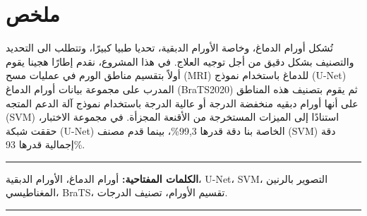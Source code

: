 \chapter*{\hfill  ملخص \hfill}

تُشكل أورام الدماغ، وخاصة الأورام الدبقية، تحديا طبيا كبيرًا، وتتطلب  الى التحديد والتصنيف بشكل دقيق من أجل توجيه العلاج. في هذا المشروع، نقدم إطارًا هجينا يقوم أولاً بتقسيم مناطق الورم في عمليات مسح \textenglish{(MRI)} للدماغ باستخدام نموذج \textenglish{(U-Net)} المدرب على مجموعة بيانات أورام الدماغ (\textenglish{BraTS2020}) ثم يقوم بتصنيف هذه المناطق على أنها أورام دبقيه منخفضة الدرجة أو عالية الدرجة باستخدام نموذج آلة الدعم المتجه \textenglish{(SVM)} استنادًا إلى الميزات المستخرجة من الأقنعة المجزأة. في مجموعة الاختبار، حققت شبكة \textenglish{(U-Net)} الخاصة بنا دقة قدرها \textenglish{99,3\%}، بينما قدم مصنف \textenglish{(SVM)} دقة إجمالية قدرها \textenglish{93\%}.

\noindent\rule{\textwidth}{0.2pt}
\textbf{الكلمات المفتاحية:} أورام الدماغ، الأورام الدبقية، \textenglish{U-Net}، \textenglish{SVM}، التصوير بالرنين المغناطيسي، \textenglish{BraTS}، تقسيم الأورام، تصنيف الدرجات.\\
\noindent\rule{\textwidth}{0.2pt}